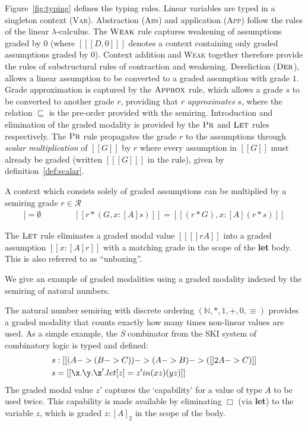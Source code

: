 Figure~\ref{fig:typing} defines the typing rules.
Linear variables are typed in a singleton context
(\textsc{Var}). Abstraction (\textsc{Abs}) and application (\textsc{App})
follow the rules of the linear $\lambda$-calculus.
The $\textsc{Weak}$ rule captures
weakening of assumptions graded by $0$ (where $[[ [ D , 0 ] ]]$ denotes a context
containing only graded assumptions graded by $0$). Context addition and
\textsc{Weak} together therefore provide the rules of substructural rules of contraction
and weakening.
Dereliction ($\textsc{Der}$),
allows a linear assumption to be converted to a graded assumption with grade
$1$. Grade approximation is captured by the $\textsc{Approx}$
rule, which allows a grade $s$ to be converted to another grade $r$,
providing that $r$ \textit{approximates} $s$, where the relation
$\sqsubseteq$ is the pre-order provided
with the semiring.
Introduction and elimination of the graded modality is provided by the
$\textsc{Pr}$ and $\textsc{Let}$ rules
respectively. The $\textsc{Pr}$ rule propagates the grade $r$ to the
assumptions through \emph{scalar multiplication} of $[[G]]$ by $r$ where
every assumption in $[[ G ]]$ must already be graded (written $[[ [ G
] ]]$ in the rule), given by definition~\eqref{def:scalar}.
%
%
\begin{definition}
  \label{def:scalar}
 A context which consists solely of graded assumptions can be multiplied by a
 semiring grade $r \in \mathcal{R}$
\begin{align*}
   [[ r * . ]] = \emptyset
    \qquad\qquad
    [[ r * (G , x : [ A ] s) ]] = [[ (r * G), x : [ A ] (r * s) ]]
\end{align*}
\end{definition}

The $\textsc{Let}$ rule eliminates a graded modal value $[[ [] r A ]]$
into a graded assumption $[[ x : [ A ] r ]]$ with a matching
grade in the scope of the \textbf{let} body. This is also referred to as
``unboxing''.

We give an example of graded modalities using a graded modality indexed
by the semiring of natural numbers.

\begin{example}
\label{ex:s-comb}
  The natural number semiring with discrete ordering
  $(\mathbb{N}, \ast, 1, +, 0, \equiv)$ provides a graded modality
  that counts exactly how many times non-linear values are used. As a
  simple example, the \emph{S} combinator from the SKI system of combinatory logic is typed and defined:
\begin{align*}
s & : [[ (A -> (B -> C)) -> {(A -> B) -> ({[] 2 A} -> C)} ]] \\
s & = [[ \x . {\y . {\z' . {let [ z ] = z' in {(x z) (y z)}}}} ]]
\end{align*}
The graded modal value $z'$ captures the `capability' for a value
of type $A$ to be used twice. This capability is made available by eliminating
$\Box$ (via \textbf{let}) to the variable $z$, which is
graded $z : [A]_2$ in the scope of the body.
\end{example}



